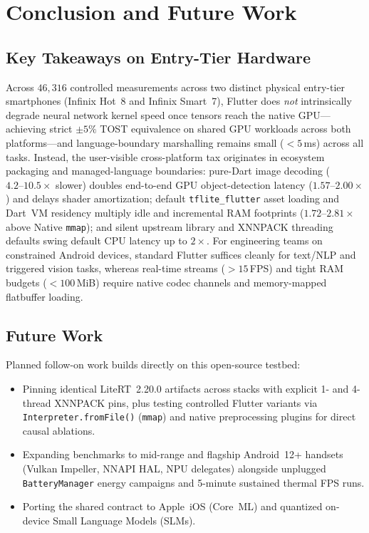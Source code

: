 \section{Conclusion and Future Work}\label{sec:conclusion}

\subsection{Key Takeaways on Entry-Tier Hardware}
Across $46{,}316$ controlled measurements across two distinct physical entry-tier smartphones (Infinix Hot~8 and Infinix Smart~7), Flutter does \emph{not} intrinsically degrade neural network kernel speed once tensors reach the native GPU---achieving strict $\pm 5\%$ TOST equivalence on shared GPU workloads across both platforms---and language-boundary marshalling remains small ($<5$\,ms) across all tasks. Instead, the user-visible cross-platform tax originates in ecosystem packaging and managed-language boundaries: pure-Dart image decoding ($4.2\text{--}10.5\times$ slower) doubles end-to-end GPU object-detection latency ($1.57\text{--}2.00\times$) and delays shader amortization; default \texttt{tflite\_flutter} asset loading and Dart~VM residency multiply idle and incremental RAM footprints ($1.72\text{--}2.81\times$ above Native \texttt{mmap}); and silent upstream library and XNNPACK threading defaults swing default CPU latency up to $2\times$. For engineering teams on constrained Android devices, standard Flutter suffices cleanly for text/NLP and triggered vision tasks, whereas real-time streams ($>15$\,FPS) and tight RAM budgets ($<100$\,MiB) require native codec channels and memory-mapped flatbuffer loading.

\subsection{Future Work}
Planned follow-on work builds directly on this open-source testbed:
\begin{itemize}
    \item Pinning identical LiteRT~2.20.0 artifacts across stacks with explicit 1- and 4-thread XNNPACK pins, plus testing controlled Flutter variants via \texttt{Interpreter.fromFile()} (\texttt{mmap}) and native preprocessing plugins for direct causal ablations.
    \item Expanding benchmarks to mid-range and flagship Android~12+ handsets (Vulkan Impeller, NNAPI HAL, NPU delegates) alongside unplugged \texttt{BatteryManager} energy campaigns and 5-minute sustained thermal FPS runs.
    \item Porting the shared contract to Apple~iOS (Core~ML) and quantized on-device Small Language Models (SLMs).
\end{itemize}

